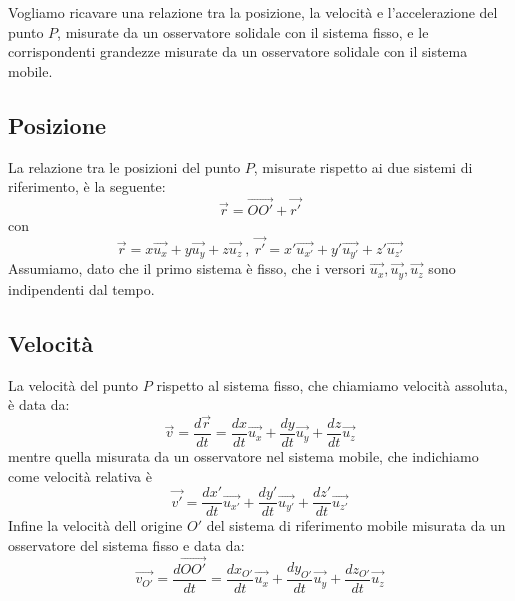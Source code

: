 \documentclass[class=book, crop=false, oneside, 12pt]{standalone}
\begin{document}
Vogliamo ricavare una relazione tra la posizione, la velocità e l'accelerazione del punto \(P\), misurate da un osservatore solidale con il sistema fisso, e le corrispondenti grandezze misurate da un osservatore solidale con il sistema mobile. 

\subsection{Posizione}

La relazione tra le posizioni del punto \(P\), misurate rispetto ai due sistemi di riferimento, è la seguente:
\begin{equation} \label{pos_p}
    \overrightarrow{r} = \overrightarrow{OO'} + \overrightarrow{r'}
\end{equation}
con 
\begin{equation*}
    \overrightarrow{r} = x \overrightarrow{u_x} + y \overrightarrow{u_y} + z \overrightarrow{u_z} \ , \ \overrightarrow{r'} = x' \overrightarrow{u_{x'}} + y' \overrightarrow{u_{y'}} + z' \overrightarrow{u_{z'}} 
\end{equation*}
Assumiamo, dato che il primo sistema è fisso, che i versori \(\overrightarrow{u_x}, \overrightarrow{u_y}, \overrightarrow{u_z}\) sono indipendenti dal tempo.

\subsection{Velocità}

La velocità del punto \(P\) rispetto al sistema fisso, che chiamiamo velocità assoluta, è data da:
\begin{equation}
    \overrightarrow{v} = \frac{d \overrightarrow{r}}{dt} = \frac{dx}{dt} \overrightarrow{u_x} + \frac{dy}{dt} \overrightarrow{u_y} + \frac{dz}{dt} \overrightarrow{u_z}
\end{equation}
mentre quella misurata da un osservatore nel sistema mobile, che indichiamo come velocità relativa è
\begin{equation}
    \overrightarrow{v'} = \frac{dx'}{dt} \overrightarrow{u_{x'}} +\frac{dy'}{dt} \overrightarrow{u_{y'}} + \frac{dz'}{dt} \overrightarrow{u_{z'}}
\end{equation}
Infine la velocità dell origine \(O'\) del sistema di riferimento mobile misurata da un osservatore del sistema fisso e data da:
\begin{equation}
    \overrightarrow{v_{O'}}=\frac{d \overrightarrow{OO'}}{d t}=\frac{d x_{O'}}{d t} \overrightarrow{u_{x}}+\frac{d y_{O'}}{d t} \overrightarrow{u_{y}}+\frac{d z_{O'}}{d t} \overrightarrow{u_{z}}
\end{equation}
\end{document}
